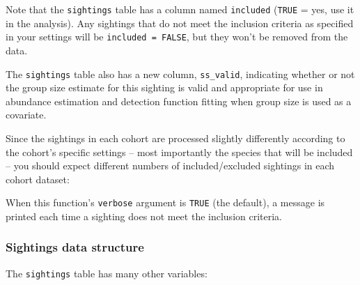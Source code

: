 \documentclass[
]{book}
\newenvironment{Shaded}{\begin{snugshade}}{\end{snugshade}}
\newcommand{\ConstantTok}[1]{\textcolor[rgb]{0.00,0.00,0.00}{#1}}
\newcommand{\DecValTok}[1]{\textcolor[rgb]{0.00,0.00,0.81}{#1}}
\newcommand{\NormalTok}[1]{#1}
\newcommand{\SpecialCharTok}[1]{\textcolor[rgb]{0.00,0.00,0.00}{#1}}
\begin{document}
Note that the \texttt{sightings} table has a column named \texttt{included} (\texttt{TRUE} = yes, use it in the analysis). Any sightings that do not meet the inclusion criteria as specified in your settings will be \texttt{included\ =\ FALSE}, but they won't be removed from the data.

The \texttt{sightings} table also has a new column, \texttt{ss\_valid},
indicating whether or not the group size estimate for this sighting
is valid and appropriate for use in abundance estimation and detection function fitting
when group size is used as a covariate.

Since the sightings in each cohort are processed slightly differently according to the cohort's specific settings -- most importantly the species that will be included -- you should expect different numbers of included/excluded sightings in each cohort dataset:

\begin{Shaded}
\end{Shaded}

When this function's \texttt{verbose} argument is \texttt{TRUE} (the default), a message is printed each time a sighting does not meet the inclusion criteria.

\hypertarget{sightings-data-structure}{%
\subsubsection*{Sightings data structure}\label{sightings-data-structure}}

The \texttt{sightings} table has many other variables:
\end{document}

